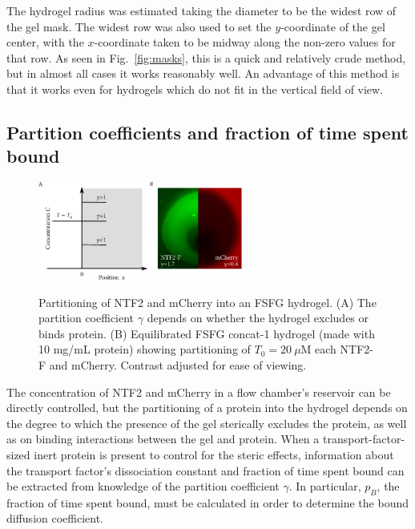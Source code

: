 The hydrogel radius was estimated taking the diameter to be the widest row of the gel mask.  The widest row was also used to set the $y$-coordinate of the gel center, with the $x$-coordinate taken to be midway along the non-zero values for that row.  As seen in Fig.~\ref{fig:masks}, this is a quick and relatively crude method, but in almost all cases it works reasonably well.  An advantage of this method is that it works even for hydrogels which do not fit in the vertical field of view.

\subsection{Partition coefficients and fraction of time spent bound}
\label{sec:part-coeff}

\begin{figure} 
\caption[Partitioning of NTF2 and mCherry into FSFG hydrogel.]{Partitioning of NTF2 and mCherry into an FSFG hydrogel.  (A) The partition coefficient $\gamma$ depends on whether the hydrogel excludes or binds protein. (B) Equilibrated FSFG concat-1 hydrogel (made with 10 mg/mL protein) showing partitioning of $T_0= 20\ \mu$M each NTF2-F and mCherry.  Contrast adjusted for ease of viewing.}
\centering
\includegraphics[width=0.6\textwidth]{figs/ch04/partition.pdf}
\label{fig:partition}
\end{figure}

The concentration of NTF2 and mCherry in a flow chamber's reservoir can be directly controlled, but the partitioning of a protein into the hydrogel depends on the degree to which the presence of the gel sterically excludes the protein, as well as on binding interactions between the gel and protein.  When a transport-factor-sized inert protein is present to control for the steric effects, information about the transport factor's dissociation constant and fraction of time spent bound can be extracted from knowledge of the partition coefficient $\gamma$.  In particular, $p_B$, the fraction of time spent bound, must be calculated in order to determine the bound diffusion coefficient.

